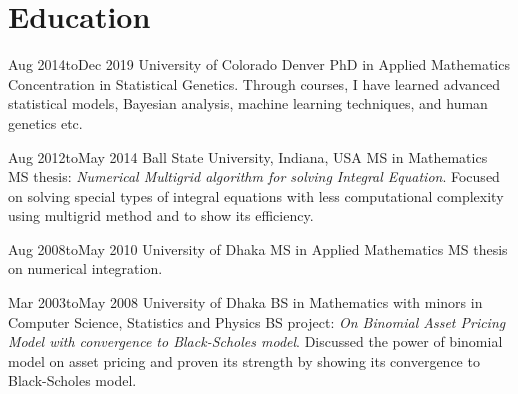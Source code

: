\section{Education}

\vspace{-0.1in}

\education
{Aug 2014}{to}{Dec 2019}
{University of Colorado Denver}
{PhD in Applied Mathematics}
{Concentration in Statistical Genetics. Through courses, I have learned advanced statistical models, Bayesian analysis, machine learning techniques, and human genetics etc. }

\education
{Aug 2012}{to}{May 2014}
{Ball State University, Indiana, USA}
{MS in Mathematics}
{MS thesis:  \textit{Numerical Multigrid algorithm for solving Integral Equation}. Focused on solving special types of integral equations with less computational complexity using multigrid method and to show its efficiency. }

\education
{Aug 2008}{to}{May 2010}
{University of Dhaka}
{MS in Applied Mathematics}
{MS thesis on numerical integration.}

\education
{Mar 2003}{to}{May 2008}
{University of Dhaka}
{BS in Mathematics with minors in Computer Science, Statistics and Physics}
{BS project: \textit{On Binomial Asset Pricing Model with convergence to Black-Scholes model}. Discussed the power of binomial model on asset pricing and proven its strength by showing its convergence to Black-Scholes model.}

\vspace{0.15in}
